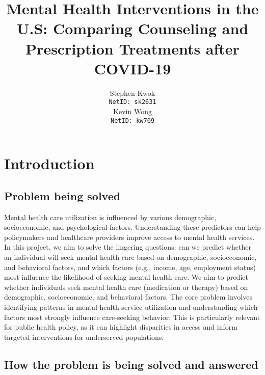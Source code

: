 \documentclass{article}
\title{\large Mental Health Interventions in the U.S: Comparing Counseling and Prescription Treatments after COVID-19}
\author{
  Stephen Kwok \\
  \texttt{NetID: sk2631} \\
  \And
  Kevin Wong \\
  \texttt{NetID: kw709} \\
}
\begin{document}
\maketitle 

\vspace{-20pt}

\section{Introduction}

\subsection{Problem being solved}

Mental health care utilization is influenced by various demographic, socioeconomic, and psychological factors. Understanding these predictors can help policymakers and healthcare providers improve access to mental health services. In this project, we aim to solve the lingering questions: can we predict whether an individual will seek mental health care based on demographic, socioeconomic, and behavioral factors, and which factors (e.g., income, age, employment status) most influence the likelihood of seeking mental health care. We aim to predict whether individuals seek mental health care (medication or therapy) based on demographic, socioeconomic, and behavioral factors. The core problem involves identifying patterns in mental health service utilization and understanding which factors most strongly influence care-seeking behavior. This is particularly relevant for public health policy, as it can highlight disparities in access and inform targeted interventions for underserved populations.


\subsection{How the problem is being solved and answered}
\end{document}

